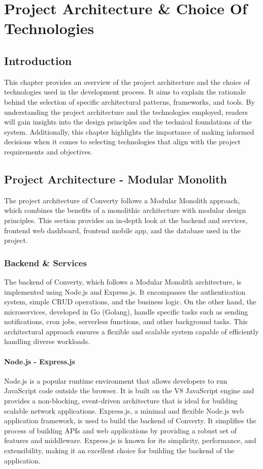 \chapter{Project Architecture \& Choice Of Technologies}
\setcounter{minitocdepth}{1}
\minitoc
\newpage

\section{Introduction}
This chapter provides an overview of the project architecture and the choice of technologies used in the development process. It aims to explain the rationale behind the selection of specific architectural patterns, frameworks, and tools. By understanding the project architecture and the technologies employed, readers will gain insights into the design principles and the technical foundations of the system. Additionally, this chapter highlights the importance of making informed decisions when it comes to selecting technologies that align with the project requirements and objectives.

\section{Project Architecture - Modular Monolith}
The project architecture of Converty follows a Modular Monolith approach, which combines the benefits of a monolithic architecture with modular design principles. This section provides an in-depth look at the backend and services, frontend web dashboard, frontend mobile app, and the database used in the project.

\subsection{Backend \& Services}
The backend of Converty, which follows a Modular Monolith architecture, is implemented using Node.js and Express.js. It encompasses the authentication system, simple CRUD operations, and the business logic. On the other hand, the microservices, developed in Go (Golang), handle specific tasks such as sending notifications, cron jobs, serverless functions, and other background tasks. This architectural approach ensures a flexible and scalable system capable of efficiently handling diverse workloads.

\subsubsection{Node.js - Express.js}
Node.js is a popular runtime environment that allows developers to run JavaScript code outside the browser. It is built on the V8 JavaScript engine and provides a non-blocking, event-driven architecture that is ideal for building scalable network applications. Express.js, a minimal and flexible Node.js web application framework, is used to build the backend of Converty. It simplifies the process of building APIs and web applications by providing a robust set of features and middleware. Express.js is known for its simplicity, performance, and extensibility, making it an excellent choice for building the backend of the application.


